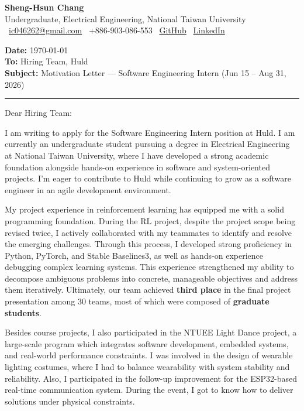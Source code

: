 \documentclass[12pt,a4paper]{article}
\makeatletter
\newcommand{\Name}{Sheng-Hsun Chang}
\newcommand{\Email}{\href{mailto:ic046262@gmail.com}{ic046262@gmail.com}}
\newcommand{\Phone}{+886-903-086-553}
\newcommand{\GitHub}{\href{https://github.com/}{GitHub}}
\newcommand{\LinkedIn}{\href{https://www.linkedin.com/}{LinkedIn}}
\makeatother
\begin{document}
{\LARGE \textbf{\Name}}\\
Undergraduate, Electrical Engineering, National Taiwan University\\
\vspace{2pt}
\faEnvelope\ \Email \quad
\faPhone\ \Phone \quad
\faGithub\ \GitHub \quad
\faLinkedin\ \LinkedIn

\vspace{14pt}

\textbf{Date:} \today\\
\textbf{To:} Hiring Team, Huld\\
\textbf{Subject:} Motivation Letter --- Software Engineering Intern (Jun 15 -- Aug 31, 2026)


\vspace{10pt}
\hrule
Dear Hiring Team:

I am writing to apply for the Software Engineering Intern position at Huld. 
I am currently an undergraduate student pursuing a degree in Electrical Engineering at 
National Taiwan University, where I have developed a strong academic foundation alongside 
hands-on experience in software and system-oriented projects. I'm
eager to contribute to Huld while continuing to 
grow as a software engineer in an agile development environment.

My project experience in reinforcement learning has equipped me with a solid programming foundation. 
During the RL project, despite the project scope being revised twice, I actively collaborated with my teammates to identify and resolve the emerging challenges. Through this process, I developed strong proficiency in Python, PyTorch, and Stable Baselines3, 
as well as hands-on experience debugging complex learning systems. 
This experience strengthened my ability to decompose ambiguous problems into concrete, manageable objectives and address them iteratively. 
Ultimately, our team achieved \textbf{third place} in the final project presentation among 30 teams, most of which were composed of \textbf{graduate students}.

Besides course projects, I also participated in the NTUEE Light Dance project, 
a large-scale program which integrates software development, embedded systems, 
and real-world performance constraints. I was involved in the design of wearable lighting costumes, 
where I had to balance wearability with system stability and reliability. Also, I participated in the follow-up 
improvement for the ESP32-based real-time communication system. During the event, I got to know how to deliver 
solutions under physical constraints.
\end{document}
